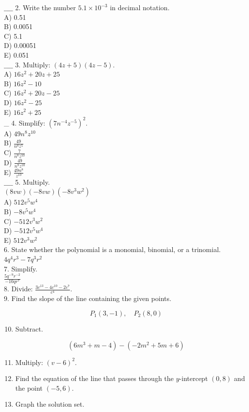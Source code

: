 \documentclass{ximera}
\begin{document}
$\_\_\_\_$ 2. Write the number $5.1 \times 10^{-3}$ in decimal notation.\\
A) 0.51\\
B) 0.0051\\
C) 5.1\\
D) 0.00051\\
E) 0.051\\
$\_\_\_\_$ 3. Multiply: $(4 z+5)(4 z-5)$.\\
A) $16 z^{2}+20 z+25$\\
B) $16 z^{2}-10$\\
C) $16 z^{2}+20 z-25$\\
D) $16 z^{2}-25$\\
E) $16 z^{2}+25$\\
\_ 4. Simplify: $\left(7 n^{-4} z^{-5}\right)^{2}$.\\
A) $49 n^{8} z^{10}$\\
B) $\frac{49}{n^{8} z^{5}}$\\
C) $\frac{7}{n^{8} z^{10}}$\\
D) $\frac{49}{n^{8} z^{10}}$\\
E) $\frac{49 n^{8}}{z^{10}}$\\
$\_\_\_\_$ 5. Multiply.\\
$(8 v w)(-8 v w)\left(-8 v^{3} w^{2}\right)$\\
A) $512 v^{5} w^{4}$\\
B) $-8 v^{5} w^{4}$\\
C) $-512 v^{3} w^{2}$\\
D) $-512 v^{5} w^{4}$\\
E) $512 v^{3} w^{2}$\\
6. State whether the polynomial is a monomial, binomial, or a trinomial. $4 q^{4} r^{3}-7 q^{3} r^{2}$\\
7. Simplify.\\
$\frac{5 q^{-9} r^{-2}}{-10 q r^{7}}$\\
8. Divide: $\frac{3 c^{13}-4 c^{10}-2 c^{7}}{c^{4}}$.\\
9. Find the slope of the line containing the given points.

$$P_{1}(3,-1), \quad P_{2}(8,0)$$

\begin{enumerate}
  \setcounter{enumi}{9}
  \item Subtract.
\end{enumerate}

$$\left(6 m^{3}+m-4\right)-\left(-2 m^{2}+5 m+6\right)$$

\begin{enumerate}
  \setcounter{enumi}{10}
  \item Multiply: $(v-6)^{2}$.
  \item Find the equation of the line that passes through the $y$-intercept $(0,8)$ and the point $(-5,6)$.
  \item Graph the solution set.
\end{enumerate}
\end{document}
